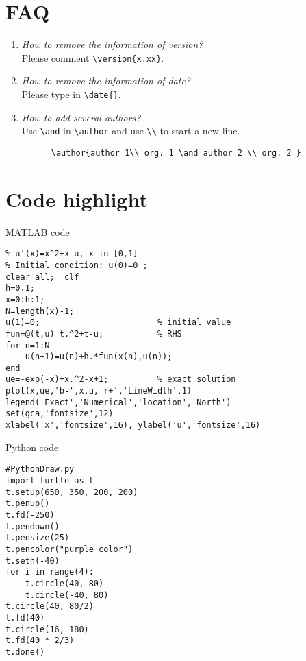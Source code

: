\documentclass[en,normal,12pt,blue]{elegantnote}
\begin{document}
\section{FAQ}

\begin{enumerate}[label=\arabic*).]
	\item \textit{How to remove the information of version?}\\
    Please comment \lstinline|\version{x.xx}|.
	\item \textit{How to remove the information of date?}\\
	  Please type in \lstinline|\date{}|.
	\item \textit{How to add several authors?}\\
	  Use \lstinline{\and} in \lstinline{\author} and use \lstinline{\\} to start a new line.
    \begin{lstlisting}
      \author{author 1\\ org. 1 \and author 2 \\ org. 2 }
    \end{lstlisting}
\end{enumerate}


\section{Code highlight}

MATLAB code

\begin{lstlisting}[style=matlab,title={MATLAB code}]
% Euler method for the ODE model
% u'(x)=x^2+x-u, x in [0,1]
% Initial condition: u(0)=0 ;
clear all;  clf
h=0.1;
x=0:h:1;
N=length(x)-1;
u(1)=0;                        % initial value
fun=@(t,u) t.^2+t-u;           % RHS
for n=1:N
    u(n+1)=u(n)+h.*fun(x(n),u(n));
end
ue=-exp(-x)+x.^2-x+1;          % exact solution
plot(x,ue,'b-',x,u,'r+','LineWidth',1)
legend('Exact','Numerical','location','North')
set(gca,'fontsize',12)
xlabel('x','fontsize',16), ylabel('u','fontsize',16)
\end{lstlisting}

Python code

\begin{lstlisting}[style=python,title={Python code}]
#PythonDraw.py
import turtle as t
t.setup(650, 350, 200, 200)
t.penup()
t.fd(-250)
t.pendown()
t.pensize(25)
t.pencolor("purple color")
t.seth(-40)
for i in range(4):
    t.circle(40, 80)
    t.circle(-40, 80)
t.circle(40, 80/2)
t.fd(40)
t.circle(16, 180)
t.fd(40 * 2/3)
t.done()
\end{lstlisting}
\end{document}

